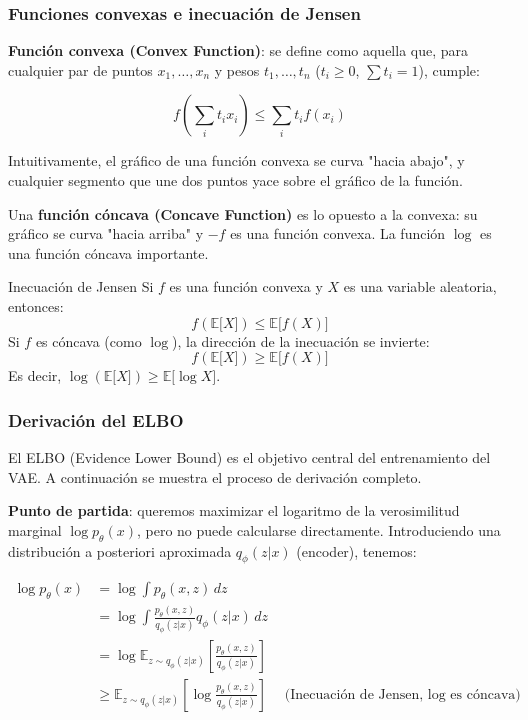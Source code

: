 \documentclass[a4paper]{article}
\begin{document}
\subsubsection{Funciones convexas e inecuación de Jensen}

\textbf{Función convexa (Convex Function)}: se define como aquella que, para cualquier par de puntos $x_1, \ldots, x_n$ y pesos $t_1, \ldots, t_n$ ($t_i \geq 0$, $\sum t_i = 1$), cumple:

$$f\left(\sum_i t_i x_i\right) \leq \sum_i t_i f(x_i)$$

Intuitivamente, el gráfico de una función convexa se curva "hacia abajo", y cualquier segmento que une dos puntos yace sobre el gráfico de la función.

Una \textbf{función cóncava (Concave Function)} es lo opuesto a la convexa: su gráfico se curva "hacia arriba" y $-f$ es una función convexa. La función $\log$ es una función cóncava importante.

\begin{importantbox}{Inecuación de Jensen}
Si $f$ es una función convexa y $X$ es una variable aleatoria, entonces:
$$f(\mathbb{E}{[}X{]}) \leq \mathbb{E}{[}f(X){]}$$
Si $f$ es cóncava (como $\log$), la dirección de la inecuación se invierte:
$$f(\mathbb{E}{[}X{]}) \geq \mathbb{E}{[}f(X){]}$$
Es decir, $\log(\mathbb{E}{[}X{]}) \geq \mathbb{E}{[}\log X{]}$.
\end{importantbox}

\subsubsection{Derivación del ELBO}

El ELBO (Evidence Lower Bound) es el objetivo central del entrenamiento del VAE. A continuación se muestra el proceso de derivación completo.

\textbf{Punto de partida}: queremos maximizar el logaritmo de la verosimilitud marginal $\log p_\theta(x)$, pero no puede calcularse directamente. Introduciendo una distribución a posteriori aproximada $q_\phi(z|x)$ (encoder), tenemos:

\begin{align}
\log p_\theta(x) &= \log \int p_\theta(x, z) \, dz \nonumber \\
&= \log \int \frac{p_\theta(x, z)}{q_\phi(z|x)} q_\phi(z|x) \, dz \nonumber \\
&= \log \mathbb{E}_{z \sim q_\phi(z|x)} \left[\frac{p_\theta(x, z)}{q_\phi(z|x)}\right] \nonumber \\
&\geq \mathbb{E}_{z \sim q_\phi(z|x)} \left[\log \frac{p_\theta(x, z)}{q_\phi(z|x)}\right] \quad \text{(Inecuación de Jensen, $\log$ es cóncava)}
\end{align}
\end{document}
